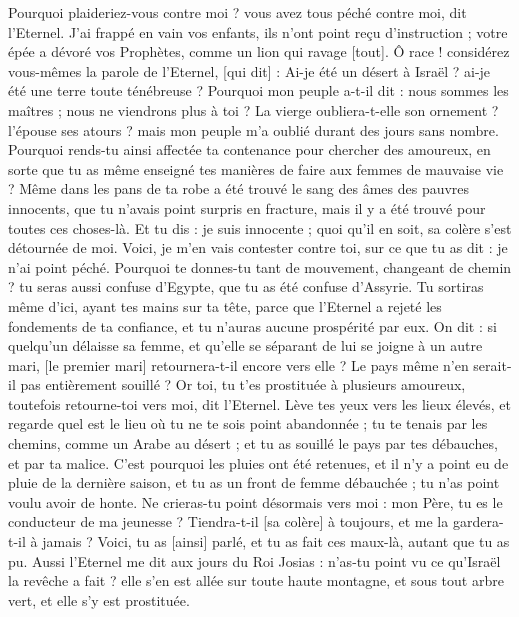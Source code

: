 \begin{multicols}{2}
Pourquoi plaideriez-vous contre moi ? vous avez tous péché contre moi, dit l'Eternel.
J'ai frappé en vain vos enfants, ils n'ont point reçu d'instruction ; votre épée a dévoré vos Prophètes, comme un lion qui ravage [tout].
Ô race ! considérez vous-mêmes la parole de l'Eternel, [qui dit] : Ai-je été un désert à Israël ? ai-je été une terre toute ténébreuse ? Pourquoi mon peuple a-t-il dit : nous sommes les maîtres ; nous ne viendrons plus à toi ?
La vierge oubliera-t-elle son ornement ? l'épouse ses atours ? mais mon peuple m'a oublié durant des jours sans nombre.
Pourquoi rends-tu ainsi affectée ta contenance pour chercher des amoureux, en sorte que tu as même enseigné tes manières de faire aux femmes de mauvaise vie ?
Même dans les pans de ta robe a été trouvé le sang des âmes des pauvres innocents, que tu n'avais point surpris en fracture, mais il y a été trouvé pour toutes ces choses-là.
Et tu dis : je suis innocente ; quoi qu'il en soit, sa colère s'est détournée de moi. Voici, je m'en vais contester contre toi, sur ce que tu as dit : je n'ai point péché.
Pourquoi te donnes-tu tant de mouvement, changeant de chemin ? tu seras aussi confuse d'Egypte, que tu as été confuse d'Assyrie.
Tu sortiras même d'ici, ayant tes mains sur ta tête, parce que l'Eternel a rejeté les fondements de ta confiance, et tu n'auras aucune prospérité par eux.
\VerseOne{}On dit : si quelqu'un délaisse sa femme, et qu'elle se séparant de lui se joigne à un autre mari, [le premier mari] retournera-t-il encore vers elle ? Le pays même n'en serait-il pas entièrement souillé ? Or toi, tu t'es prostituée à plusieurs amoureux, toutefois retourne-toi vers moi, dit l'Eternel.
Lève tes yeux vers les lieux élevés, et regarde quel est le lieu où tu ne te sois point abandonnée ; tu te tenais par les chemins, comme un Arabe au désert ; et tu as souillé le pays par tes débauches, et par ta malice.
C'est pourquoi les pluies ont été retenues, et il n'y a point eu de pluie de la dernière saison, et tu as un front de femme débauchée ; tu n'as point voulu avoir de honte.
Ne crieras-tu point désormais vers moi : mon Père, tu es le conducteur de ma jeunesse ?
Tiendra-t-il [sa colère] à toujours, et me la gardera-t-il à jamais ? Voici, tu as [ainsi] parlé, et tu as fait ces maux-là, autant que tu as pu.
Aussi l'Eternel me dit aux jours du Roi Josias : n'as-tu point vu ce qu'Israël la revêche a fait ? elle s'en est allée sur toute haute montagne, et sous tout arbre vert, et elle s'y est prostituée.

\end{multicols}
